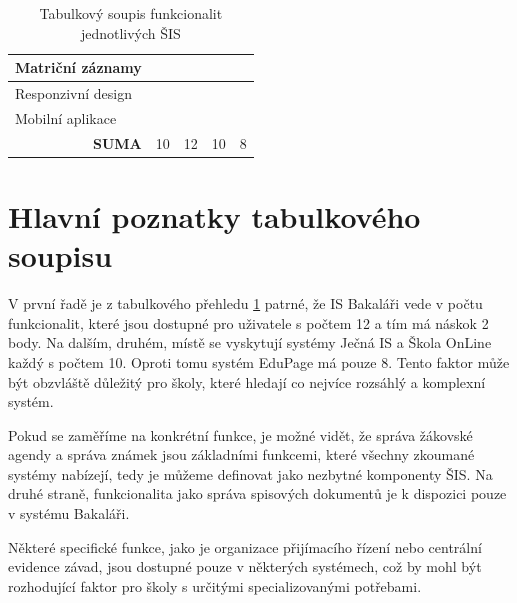 \documentclass[FM,Proj]{tulthesis}
\newcommand{\ccheckmark}{{\color[HTML]{009901} \CheckmarkBold}}
\newcommand{\ccrossmark}{{\color[HTML]{CB0000} \XSolid}}
\begin{document}
\begin{table}[H]
\begin{tabular}{lcccc}
    \multicolumn{1}{|l|}{Matriční záznamy}              & \multicolumn{1}{c|}{\ccheckmark}          & \multicolumn{1}{c|}{\ccheckmark} & \multicolumn{1}{c|}{\ccheckmark}                                        & \multicolumn{1}{c|}{\ccheckmark}          \\ \hline
    \multicolumn{1}{|l|}{Responzivní design}            & \multicolumn{1}{c|}{\ccrossmark} & \multicolumn{1}{c|}{\ccheckmark}          & \multicolumn{1}{c|}{\ccheckmark}                                        & \multicolumn{1}{c|}{\ccheckmark}          \\ \hline
    \multicolumn{1}{|l|}{Mobilní aplikace}              & \multicolumn{1}{c|}{\ccrossmark} & \multicolumn{1}{c|}{\ccheckmark}          & \multicolumn{1}{c|}{\ccheckmark}                                        & \multicolumn{1}{c|}{\ccheckmark}          \\ \hline
    \multicolumn{1}{r}{\textbf{SUMA}}                   & 10                                                     & \multicolumn{1}{l}{12}                                 & \multicolumn{1}{l}{10}                                                               & \multicolumn{1}{l}{8}                                  \\ \hline

    \end{tabular}
    \caption{Tabulkový soupis funkcionalit jednotlivých ŠIS}
    \label{table:functionality}
\end{table}

\section{Hlavní poznatky tabulkového soupisu}
V první řadě je z tabulkového přehledu \ref{table:functionality} patrné, že IS Bakaláři
vede v počtu funkcionalit, které jsou dostupné pro uživatele s počtem 12 a tím má náskok 2
body. Na dalším, druhém, místě se vyskytují systémy Ječná IS a Škola OnLine každý s počtem 10. 
Oproti tomu systém EduPage má pouze 8. Tento
faktor může být obzvláště důležitý pro školy, které hledají co nejvíce rozsáhlý a komplexní systém.

Pokud se zaměříme na konkrétní funkce, je možné vidět, že správa žákovské agendy a správa známek
jsou základními funkcemi, které všechny zkoumané systémy nabízejí, tedy je můžeme definovat 
jako nezbytné komponenty ŠIS. Na druhé straně, funkcionalita jako správa spisových dokumentů je k dispozici pouze v systému
Bakaláři.

Některé specifické funkce, jako je organizace přijímacího řízení nebo
centrální evidence závad, jsou dostupné pouze v některých systémech, což by mohl
být rozhodující faktor pro školy s určitými specializovanými potřebami.
\end{document}
